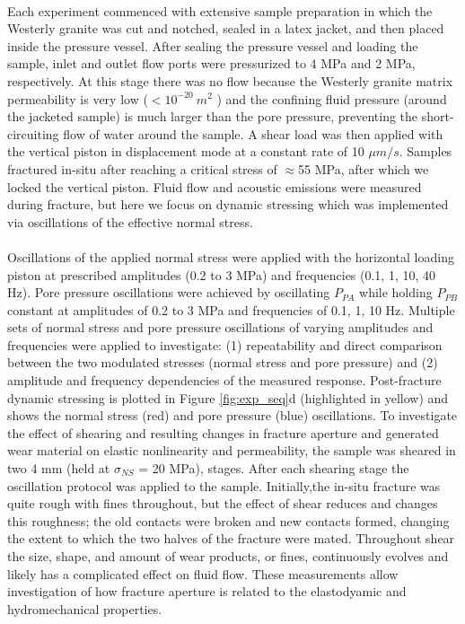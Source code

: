 \documentclass[letterpaper,10pt]{article}
\begin{document}
\paragraph{}
Each experiment commenced with extensive sample preparation in which the Westerly granite was cut and notched, sealed in a latex jacket, and then placed inside the pressure vessel. After sealing the pressure vessel and loading the sample, inlet and outlet flow ports were pressurized to 4 MPa and 2 MPa, respectively. At this stage there was no flow because the Westerly granite matrix permeability is very low ($< 10^{-20}\ m^2$ ) and the confining fluid pressure (around the jacketed sample) is much larger than the pore pressure, preventing the short-circuiting flow of water around the sample.
A shear load was then applied with the vertical piston in displacement mode at a constant rate of 10 $\mu m/s$. Samples fractured in-situ after reaching a critical stress of $ \approx $55 MPa, after which we locked the vertical piston. Fluid flow and acoustic emissions were measured during fracture, but here we focus on dynamic stressing which was implemented via oscillations of the effective normal stress.
\paragraph{}
Oscillations of the applied normal stress were applied with the horizontal loading piston at prescribed amplitudes (0.2 to 3 MPa) and frequencies (0.1, 1, 10, 40 Hz). Pore pressure oscillations were achieved by oscillating $P_{PA}$ while holding $P_{PB}$ constant at amplitudes of 0.2 to 3 MPa and frequencies of 0.1, 1, 10 Hz. Multiple sets of normal stress and pore pressure oscillations of varying amplitudes and frequencies were applied to investigate: (1) repeatability and direct comparison between the two modulated stresses (normal stress and pore pressure) and (2) amplitude and frequency dependencies of the measured response. Post-fracture dynamic stressing is plotted in Figure \ref{fig:exp_seq}d (highlighted in yellow) and shows the normal stress (red) and pore pressure (blue) oscillations.
To investigate the effect of shearing and resulting changes in fracture aperture and generated wear material on elastic nonlinearity and permeability, the sample was sheared in two 4 mm (held at $ \sigma_{NS} $ = 20 MPa), stages. After each shearing stage the oscillation protocol was applied to the sample. Initially,the in-situ fracture was quite rough with fines throughout, but the effect of shear reduces and changes this roughness; the old contacts were broken and new contacts formed, changing the extent to which the two halves of the fracture were mated. Throughout shear the size, shape, and amount of wear products, or fines, continuously evolves and likely has a complicated effect on fluid flow. These measurements allow investigation of how fracture aperture is related to the elastodyamic and hydromechanical properties.
\end{document}
